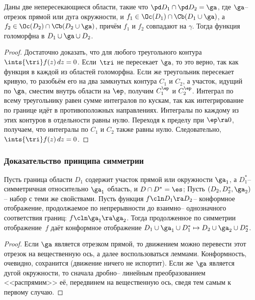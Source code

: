 \documentclass[a4paper]{article}
\begin{document}
\begin{lemma}
Даны две непересекающиеся области, такие что $\pd D_1 \cap \pd D_2=\ga$, где $\ga$-- отрезок прямой
или дуга окружности, и  $f_1 \in \Oc(D_1) \cap \Cb(D_1 \cup \ga)$, а $f_2 \in \Oc(D_2) \cap \Cb(D_2 \cup\ga)$, причём $f_1$ и $f_2$ совпадают на $\gamma$.
Тогда функция
голоморфна в $D_1 \cup \ga \cup D_2$.
\end{lemma}
\begin{proof}
Достаточно доказать, что для любого треугольного
контура $\ints{\tri} f(z)\,dz=0$. Если~$\tri$ не
пересекает $\ga$, то это верно, так как функция в каждой из областей голоморфна.
Если же треугольник пересекает кривую, то разобьём его на два замкнутых контура $C_1$ и $C_2$, а
участок, идущий по $\ga$, сместим внутрь области на $\ep$, получим $C_1^\ep$ и $C_2^\ep$.
Интеграл по всему треугольнику равен сумме интегралов по кускам, так как интегрирование по границе
идёт в противоположных направлениях. Интегралы по каждому из этих контуров в отдельности равны нулю.
Переходя к пределу при $\ep\ra 0$, получаем, что интегралы по $C_1$ и $C_2$  также равны нулю. Следовательно,
$\ints{\tri}f(z)\,dz=0$.
\end{proof}

\subsubsection{Доказательство принципа симметрии}

\begin{theorem}
Пусть граница области $D_1$ содержит участок прямой или окружности $\ga_1$, а $D_1^*$--
симметричная относительно $\ga_1$ область, и $D \cap D^*=\es$;
Пусть $(D_2, D_2^*,\ga_2)$-- набор с теми же свойствами. Пусть функция $f\cln D_1\ra D_2$-- конформное
отображение, продолжаемое по непрерывности до взаимно-- однозначного соответствия границ: $f\cln \ga_1 \ra \ga_2$.
Тогда продолженное по симметрии отображение~$f$ даёт конформное отображение
$D_1\cup\ga_1\cup D_1^* \mapsto D_2\cup\ga_2\cup D_2^*$.
\end{theorem}
\begin{proof}
Если $\ga$ является отрезком прямой, то движением можно перевести этот отрезок на вещественную ось, а далее воспользоваться
леммами. Конформность, очевидно, сохранится (движение ничего не испортит). Если же $\ga$ является дугой окружности, то
сначала дробно-- линейным преобразованием <<распрямим>> её, передвинем на вещественную ось, сведя тем самым к первому случаю.
\end{proof}
\end{document}
